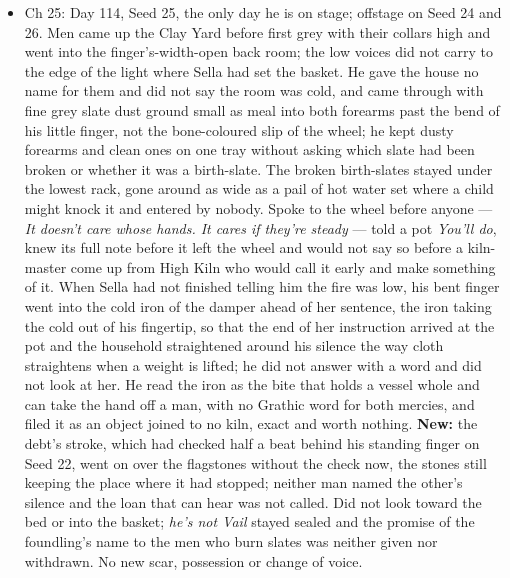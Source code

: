 \documentclass{design/chronicle}
\begin{document}
{\begin{itemize}[leftmargin=1.4em,itemsep=1pt,topsep=3pt,parsep=0pt]
\item Ch 25: Day 114, Seed 25, the only day he is on stage; offstage on Seed 24 and 26. Men came up the Clay Yard before first grey with their collars high and went into the finger’s-width-open back room; the low voices did not carry to the edge of the light where Sella had set the basket. He gave the house no name for them and did not say the room was cold, and came through with fine grey slate dust ground small as meal into both forearms past the bend of his little finger, not the bone-coloured slip of the wheel; he kept dusty forearms and clean ones on one tray without asking which slate had been broken or whether it was a birth-slate. The broken birth-slates stayed under the lowest rack, gone around as wide as a pail of hot water set where a child might knock it and entered by nobody. Spoke to the wheel before anyone — \emph{It doesn’t care whose hands. It cares if they’re steady} — told a pot \emph{You’ll do}, knew its full note before it left the wheel and would not say so before a kiln-master come up from High Kiln who would call it early and make something of it. When Sella had not finished telling him the fire was low, his bent finger went into the cold iron of the damper ahead of her sentence, the iron taking the cold out of his fingertip, so that the end of her instruction arrived at the pot and the household straightened around his silence the way cloth straightens when a weight is lifted; he did not answer with a word and did not look at her. He read the iron as the bite that holds a vessel whole and can take the hand off a man, with no Grathic word for both mercies, and filed it as an object joined to no kiln, exact and worth nothing. \textbf{New:} the debt’s stroke, which had checked half a beat behind his standing finger on Seed 22, went on over the flagstones without the check now, the stones still keeping the place where it had stopped; neither man named the other’s silence and the loan that can hear was not called. Did not look toward the bed or into the basket; \emph{he’s not Vail} stayed sealed and the promise of the foundling’s name to the men who burn slates was neither given nor withdrawn. No new scar, possession or change of voice.

\end{itemize}

\begin{itemize}[leftmargin=1.4em,itemsep=1pt,topsep=3pt,parsep=0pt]


\end{itemize}}
\end{document}
